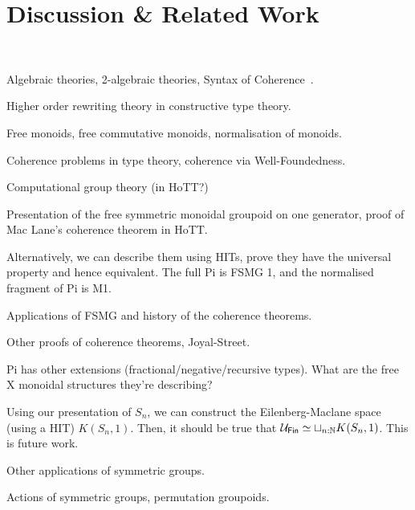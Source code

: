 \section{Discussion \& Related Work}~\label{sec:discussion}

Algebraic theories, 2-algebraic theories, Syntax of Coherence~\cite{yanofskySyntaxCoherence2000}.

Higher order rewriting theory in constructive type theory.

Free monoids, free commutative monoids, normalisation of monoids.

Coherence problems in type theory, coherence via Well-Foundedness.

Computational group theory (in HoTT?)

Presentation of the free symmetric monoidal groupoid on one generator, proof of Mac Lane's coherence theorem in HoTT.

Alternatively, we can describe them using HITs, prove they have the universal property and hence equivalent.
The full Pi is FSMG 1, and the normalised fragment of Pi is M1.

Applications of FSMG and history of the coherence theorems.

Other proofs of coherence theorems, Joyal-Street.

Pi has other extensions (fractional/negative/recursive types).
What are the free X monoidal structures they're describing?

Using our presentation of $S_{n}$, we can construct the Eilenberg-Maclane space (using a HIT) $K(S_{n},1)$. Then, it
should be true that $\UFin \eqv \sqcup_{n:\Nat} K(S_{n},1)$. This is future work.

Other applications of symmetric groups.

Actions of symmetric groups, permutation groupoids.

